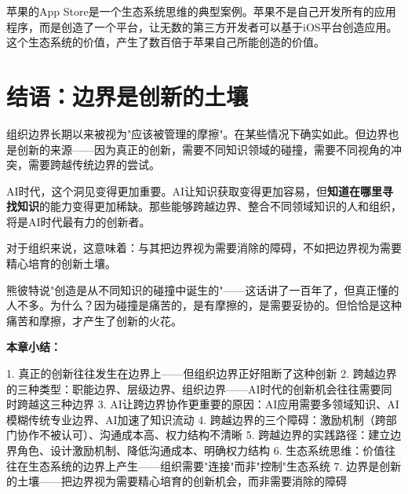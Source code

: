 苹果的App Store是一个生态系统思维的典型案例。苹果不是自己开发所有的应用程序，而是创造了一个平台，让无数的第三方开发者可以基于iOS平台创造应用。这个生态系统的价值，产生了数百倍于苹果自己所能创造的价值。

\section{结语：边界是创新的土壤}


组织边界长期以来被视为"应该被管理的摩擦"。在某些情况下确实如此。但边界也是创新的来源——因为真正的创新，需要不同知识领域的碰撞，需要不同视角的冲突，需要跨越传统边界的尝试。

AI时代，这个洞见变得更加重要。AI让知识获取变得更加容易，但\textbf{知道在哪里寻找知识}的能力变得更加稀缺。那些能够跨越边界、整合不同领域知识的人和组织，将是AI时代最有力的创新者。

对于组织来说，这意味着：与其把边界视为需要消除的障碍，不如把边界视为需要精心培育的创新土壤。

熊彼特说"创造是从不同知识的碰撞中诞生的"——这话讲了一百年了，但真正懂的人不多。为什么？因为碰撞是痛苦的，是有摩擦的，是需要妥协的。但恰恰是这种痛苦和摩擦，才产生了创新的火花。


\textbf{本章小结：}

1. 真正的创新往往发生在边界上——但组织边界正好阻断了这种创新
2. 跨越边界的三种类型：职能边界、层级边界、组织边界——AI时代的创新机会往往需要同时跨越这三种边界
3. AI让跨边界协作更重要的原因：AI应用需要多领域知识、AI模糊传统专业边界、AI加速了知识流动
4. 跨越边界的三个障碍：激励机制（跨部门协作不被认可）、沟通成本高、权力结构不清晰
5. 跨越边界的实践路径：建立边界角色、设计激励机制、降低沟通成本、明确权力结构
6. 生态系统思维：价值往往在生态系统的边界上产生——组织需要"连接"而非"控制"生态系统
7. 边界是创新的土壤——把边界视为需要精心培育的创新机会，而非需要消除的障碍
